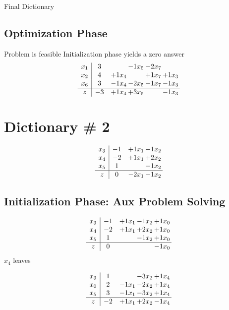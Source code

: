 \documentclass[12pt]{article}
\begin{document}
  Final Dictionary

\subsection{Optimization Phase}

Problem is feasible Initialization phase yields a zero answer 
\[\begin{array}{c| c c@{\hskip 2pt} c@{\hskip 2pt} c@{\hskip 2pt} c@{\hskip 2pt} }
 x_{1}   &  3  &   & -1 x_{5} & -2 x_{7} &   \\
 x_{2}   &  4 & + 1 x_{4} &   & + 1 x_{7} & + 1 x_{3}\\
 x_{6}   &  3 & -1 x_{4} & -2 x_{5} & -1 x_{7} & -1 x_{3}\\
\hline
z    &  -3 & + 1 x_{4} & + 3 x_{5} &   & -1 x_{3}\\
\end{array}\]


\section{Dictionary \# 2}

\[\begin{array}{c| c c@{\hskip 2pt} c@{\hskip 2pt} }
 x_{3}   &  -1 & + 1  x_{1} & -1  x_{2}\\
 x_{4}   &  -2 & + 1  x_{1} & + 2  x_{2}\\
 x_{5}   &  1  &   & -1  x_{2}\\
\hline
z    &  0 & -2  x_{1} & -1  x_{2}\\
\end{array}\]

\subsection{Initialization Phase: Aux Problem Solving}
\[\begin{array}{c| c c@{\hskip 2pt} c@{\hskip 2pt} c@{\hskip 2pt} }
 x_{3}   &  -1 & + 1  x_{1} & -1  x_{2} & + 1  x_{0}\\
 x_{4}   &  -2 & + 1  x_{1} & + 2  x_{2} & + 1  x_{0}\\
 x_{5}   &  1  &   & -1  x_{2} & + 1  x_{0}\\
\hline
z    &  0  &    &   & -1  x_{0}\\
\end{array}\]
$ x_{4} $ leaves 

 \[\begin{array}{c| c c@{\hskip 2pt} c@{\hskip 2pt} c@{\hskip 2pt} }
 x_{3}   &  1  &   & -3  x_{2} & + 1  x_{4}\\
 x_{0}   &  2 & -1  x_{1} & -2  x_{2} & + 1  x_{4}\\
 x_{5}   &  3 & -1  x_{1} & -3  x_{2} & + 1  x_{4}\\
\hline
z    &  -2 & + 1  x_{1} & + 2  x_{2} & -1  x_{4}\\
\end{array}\]
\end{document}
